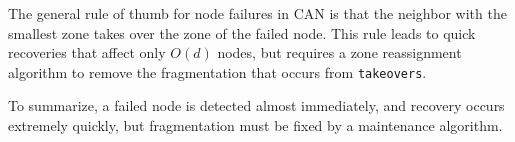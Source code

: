 \documentclass[10pt,letterpaper,twoside]{report}
\begin{document}
The general rule of thumb for node failures in CAN is that the neighbor with the smallest zone takes over the zone of the failed node.
This rule leads to quick recoveries that affect only $O(d)$ nodes, but requires a zone reassignment algorithm to remove the fragmentation that occurs from \texttt{takeovers}.

To summarize, a failed node is detected almost immediately, and recovery occurs extremely quickly, but fragmentation must be fixed by a maintenance algorithm.













\end{document}
